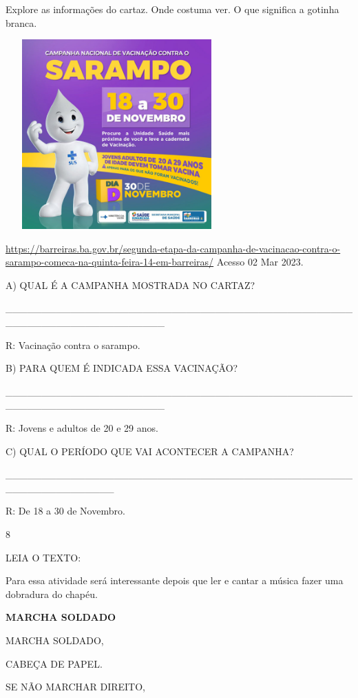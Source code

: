 {{{Explore as informações do cartaz. Onde costuma ver. O que significa a
gotinha branca.

\includegraphics[width=3.36943in,height=2.86363in]{media/image85.jpeg}

\url{https://barreiras.ba.gov.br/segunda-etapa-da-campanha-de-vacinacao-contra-o-sarampo-comeca-na-quinta-feira-14-em-barreiras/}
Acesso 02 Mar 2023.

A) QUAL É A CAMPANHA MOSTRADA NO CARTAZ?

\_\_\_\_\_\_\_\_\_\_\_\_\_\_\_\_\_\_\_\_\_\_\_\_\_\_\_\_\_\_\_\_\_\_\_\_\_\_\_\_\_\_\_\_\_\_\_\_\_\_\_\_\_\_\_\_\_\_\_\_\_\_\_\_\_\_\_\_\_\_

R: Vacinação contra o sarampo.

B) PARA QUEM É INDICADA ESSA VACINAÇÃO?

\_\_\_\_\_\_\_\_\_\_\_\_\_\_\_\_\_\_\_\_\_\_\_\_\_\_\_\_\_\_\_\_\_\_\_\_\_\_\_\_\_\_\_\_\_\_\_\_\_\_\_\_\_\_\_\_\_\_\_\_\_\_\_\_\_\_\_\_\_\_

R: Jovens e adultos de 20 e 29 anos.

C) QUAL O PERÍODO QUE VAI ACONTECER A CAMPANHA?

\_\_\_\_\_\_\_\_\_\_\_\_\_\_\_\_\_\_\_\_\_\_\_\_\_\_\_\_\_\_\_\_\_\_\_\_\_\_\_\_\_\_\_\_\_\_\_\_\_\_\_\_\_\_\_\_\_\_\_\_\_\_\_

R: De 18 a 30 de Novembro.

\num{8}

LEIA O TEXTO:

Para essa atividade será interessante depois que ler e cantar a música
fazer uma dobradura do chapéu.

\textbf{MARCHA SOLDADO}

MARCHA SOLDADO,

CABEÇA DE PAPEL.

SE NÃO MARCHAR DIREITO,

}}}
